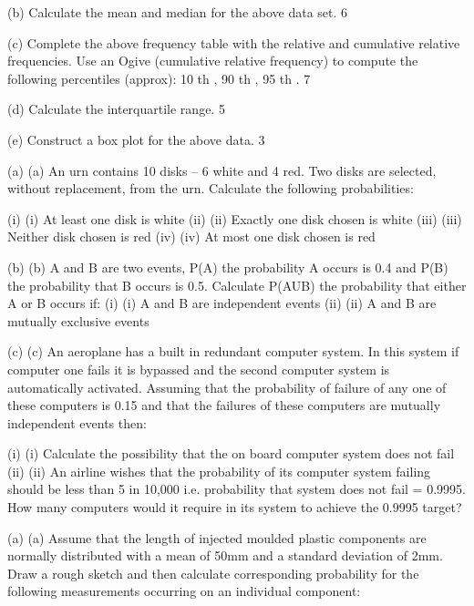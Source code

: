 (b) Calculate the mean and median for the above data set.			6 
 
(c) Complete the above frequency table with the relative and cumulative relative frequencies. Use an Ogive (cumulative relative frequency) to compute the following  percentiles  (approx): 10 th , 90 th , 95 th . 				7 
 
(d) Calculate the interquartile range. 						5
 
(e) Construct a box plot for the above data. 					3



(a)	(a)    An urn contains 10 disks – 6 white and 4 red.  Two disks are selected, without replacement, from the urn.  Calculate the following probabilities:
 
(i)	(i)                  At least one disk is white
(ii)	(ii)                Exactly one disk chosen is white
(iii)	(iii)               Neither disk chosen is red
(iv)	(iv)              At most one disk chosen is red

 
(b)	(b)   A and B are two events, P(A)  the probability A occurs is 0.4 and P(B) the probability that B occurs is 0.5.  Calculate P(AUB) the probability that either A or B occurs if:
(i)	(i)                  A and B are independent events
(ii)	(ii)                A and B are mutually exclusive events


(c)	(c)    An aeroplane has a built in redundant computer system.  In this system if computer one fails it is bypassed and the second computer system is automatically activated.  Assuming that the probability of failure of any one of these computers is 0.15 and that the failures of these computers are mutually independent events then:
 
(i)	(i)                  Calculate the possibility that the on board computer system does not fail
(ii)	(ii)                An airline wishes that the probability of its computer system failing should be less than 5 in 10,000 i.e. probability that system does not fail = 0.9995.  How many computers would it require in its system to achieve the 0.9995 target?
 
 
 

(a)	(a)    Assume that the length of injected moulded plastic components are normally distributed with a mean of 50mm and a standard deviation of 2mm.  Draw a rough sketch and then calculate corresponding probability for the following measurements occurring on an individual component:
 
